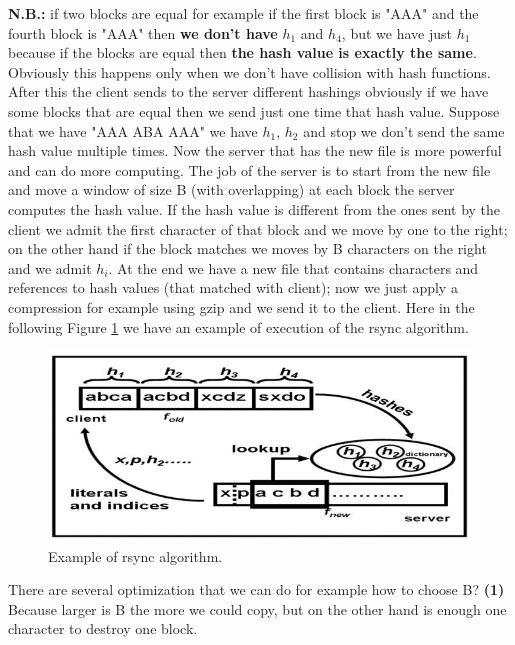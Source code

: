 \textbf{N.B.:} if two blocks are equal for example if the first block is "AAA" and the fourth block is "AAA" then \textbf{we don't have} $h_1$ and $h_4$, but we have just $h_1$ because if the blocks are equal then \textbf{the hash value is exactly the same}. Obviously this happens only when we don't have collision with hash functions.\newline
After this the client sends to the server different hashings obviously if we have some blocks that are equal then we send just one time that hash value. Suppose that we have "AAA ABA AAA" we have $h_1$, $h_2$ and stop we don't send the same hash value multiple times.\newline
Now the server that has the new file is more powerful and can do more computing. The job of the server is to start from the new file and move a window of size B (with overlapping) at each block the server computes the hash value. If the hash value is different from the ones sent by the client we admit the first character of that block and we move by one to the right; on the other hand if the block matches we moves by B characters on the right and we admit $h_i$.\newline
At the end we have a new file that contains characters and references to hash values (that matched with client); now we just apply a compression for example using gzip and we send it to the client.\newline
Here in the following Figure \ref{fig:rsync} we have an example of execution of the rsync algorithm.\newline
\begin{figure}
    \centering
    \includegraphics[width=0.75\linewidth]{images/rsync.PNG}
    \caption{Example of rsync algorithm.}
    \label{fig:rsync}
\end{figure}
There are several optimization that we can do for example how to choose B? \textbf{(1)} Because larger is B the more we could copy, but on the other hand is enough one character to destroy one block.\newline
